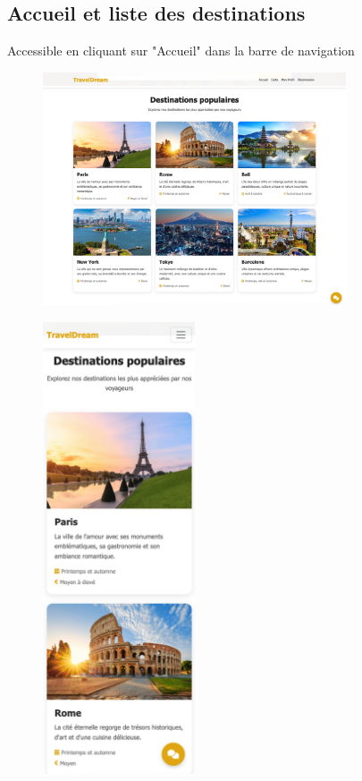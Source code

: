 \documentclass[a4paper,12pt]{article}
\begin{document}
\subsection{Accueil et liste des destinations}
Accessible en cliquant sur "Accueil" dans la barre de navigation
\begin{figure}[H]
    \centering
    \includegraphics[width=0.8\textwidth]{4_accueil_1.png}
\end{figure}
\begin{figure}[H]
    \centering
    \includegraphics[width=0.4\textwidth]{4_accueil_2.png}
\end{figure}
\end{document}
